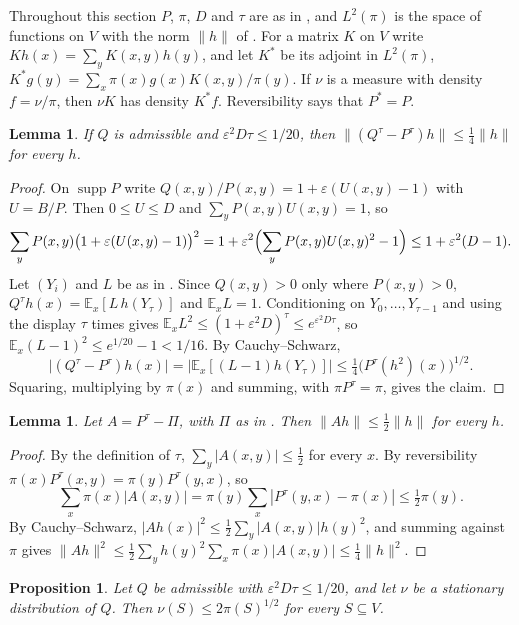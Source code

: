 \documentclass[11pt]{article}
\newtheorem{lemma}[theorem]{Lemma}
\newtheorem{proposition}[theorem]{Proposition}
\theoremstyle{remark}
\theoremstyle{plain}
\DeclareMathOperator{\supp}{supp}
\begin{document}
Throughout this section $P$, $\pi$, $D$ and $\tau$ are as in , and $L^2(\pi)$ is the space of functions
on $V$ with the norm $\|h\|$ of . For a matrix $K$ on $V$ write $Kh(x)=\sum_yK(x,y)h(y)$, and let $K^*$ be its
adjoint in $L^2(\pi)$, $K^*g(y)=\sum_x\pi(x)g(x)K(x,y)/\pi(y)$. If $\nu$ is a measure with density $f=\nu/\pi$, then
$\nu K$ has density $K^*f$. Reversibility says that $P^*=P$.

\begin{lemma}\label{lem:lr}
If $Q$ is admissible and $\varepsilon^2D\tau\le1/20$, then $\|(Q^\tau -P^\tau)h\|\le\frac14\|h\|$ for every $h$.
\end{lemma}

\begin{proof}
On $\supp P$ write $Q(x,y)/P(x,y)=1+\varepsilon(U(x,y)-1)$ with $U=B/P$. Then $0\le U\le D$ and
$\sum_yP(x,y)U(x,y)=1$, so
\[
\sum_yP(x,y)\bigl(1+\varepsilon(U(x,y)-1)\bigr)^2=1+\varepsilon^2\Bigl(\sum_yP(x,y)U(x,y)^2-1\Bigr)\le1+\varepsilon^2(D-1).
\]
Let $(Y_i)$ and $L$ be as in . Since $Q(x,y)>0$ only
where $P(x,y)>0$, $Q^\tau h(x)=\mathbb E_x[L\,h(Y_\tau)]$ and $\mathbb E_x L=1$. Conditioning on $Y_0,\dots,Y_{\tau -1}$
and using the display $\tau$ times gives $\mathbb E_xL^2\le(1+\varepsilon^2D)^\tau\le e^{\varepsilon^2D\tau}$, so
$\mathbb E_x(L-1)^2\le e^{1/20}-1<1/16$. By Cauchy--Schwarz,
\[
\bigl|(Q^\tau -P^\tau)h(x)\bigr|=\bigl|\mathbb E_x[(L-1)h(Y_\tau)]\bigr|\le\tfrac14\bigl(P^\tau (h^2)(x)\bigr)^{1/2}.
\]
Squaring, multiplying by $\pi(x)$ and summing, with $\pi P^\tau=\pi$, gives the claim.
\end{proof}

\begin{lemma}\label{lem:gap}
Let $A=P^\tau -\Pi$, with $\Pi$ as in . Then $\|Ah\|\le\frac12\|h\|$ for every $h$.
\end{lemma}

\begin{proof}
By the definition of $\tau$, $\sum_y|A(x,y)|\le\frac12$ for every $x$. By reversibility
$\pi(x)P^\tau (x,y)=\pi(y)P^\tau (y,x)$, so
\[
\sum_x\pi(x)|A(x,y)|=\pi(y)\sum_x|P^\tau (y,x)-\pi(x)|\le\tfrac12\pi(y).
\]
By Cauchy--Schwarz, $|Ah(x)|^2\le\frac12\sum_y|A(x,y)|h(y)^2$, and summing against $\pi$ gives
$\|Ah\|^2\le\frac12\sum_yh(y)^2\sum_x\pi(x)|A(x,y)|\le\frac14\|h\|^2$.
\end{proof}

\begin{proposition}\label{prop:stat}
Let $Q$ be admissible with $\varepsilon^2D\tau\le1/20$, and let $\nu$ be a stationary distribution of $Q$. Then
$\nu(S)\le2\pi(S)^{1/2}$ for every $S\subseteq V$.
\end{proposition}
\end{document}
